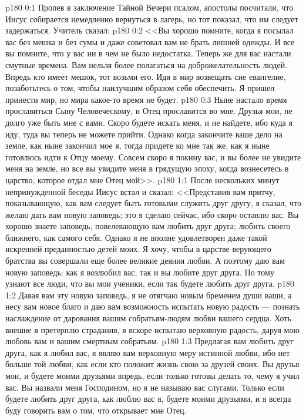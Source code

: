 \vs p180 0:1 Пропев в заключение Тайной Вечери псалом, апостолы посчитали, что Иисус собирается немедленно вернуться в лагерь, но тот показал, что им следует задержаться. Учитель сказал:
\vs p180 0:2 <<Вы хорошо помните, когда я посылал вас без мешка и без сумы и даже советовал вам не брать лишней одежды. И все вы помните, что у вас ни в чем не было недостатка. Теперь же для вас настали смутные времена. Вам нельзя более полагаться на доброжелательность людей. Впредь кто имеет мешок, тот возьми его. Идя в мир возвещать сие евангелие, позаботьтесь о том, чтобы наилучшим образом себя обеспечить. Я пришел принести мир, но мира какое\hyp{}то время не будет.
\vs p180 0:3 Ныне настало время прославиться Сыну Человеческому, и Отец прославится во мне. Друзья мои, не долго уже быть мне с вами. Скоро будете искать меня, и не найдете, ибо куда я иду, туда вы теперь не можете прийти. Однако когда закончите ваше дело на земле, как ныне закончил мое я, тогда придете ко мне так же, как я ныне готовлюсь идти к Отцу моему. Совсем скоро я покину вас, и вы более не увидите меня на земле, но все вы увидите меня в грядущую эпоху, когда вознесетесь в царство, которое отдал мне Отец мой>>.
\vs p180 1:1 После нескольких минут непринужденной беседы Иисус встал и сказал: <<Представив вам притчу, показывающую, как вам следует быть готовыми служить друг другу, я сказал, что желаю дать вам новую заповедь; это я сделаю сейчас, ибо скоро оставлю вас. Вы хорошо знаете заповедь, повелевающую вам любить друг друга; любить своего ближнего, как самого себя. Однако я не вполне удовлетворен даже такой искренней преданностью детей моих. Я хочу, чтобы в царстве верующего братства вы совершали еще более великие деяния любви. А поэтому даю вам новую заповедь: как я возлюбил вас, так и вы любите друг друга. По тому узнают все люди, что вы мои ученики, если так будете любить друг друга.
\vs p180 1:2 Давая вам эту новую заповедь, я не отягчаю новым бременем души ваши, а несу вам новое благо и даю вам возможность испытать новую радость --- познать наслаждение от дарования вашим собратьям\hyp{}людям любви вашего сердца. Хоть внешне я претерплю страдания, я вскоре испытаю верховную радость, даруя мою любовь вам и вашим смертным собратьям.
\vs p180 1:3 Предлагая вам любить друг друга, как я любил вас, я являю вам верховную меру истинной любви, ибо нет больше той любви, как если кто положит жизнь свою за друзей своих. Вы друзья мои, и будете моими друзьями впредь, если только готовы делать то, чему я учил вас. Вы назвали меня Господином, но я не называю вас слугами. Только если будете любить друг друга, как люблю вас я, будете моими друзьями, и я всегда буду говорить вам о том, что открывает мне Отец.
